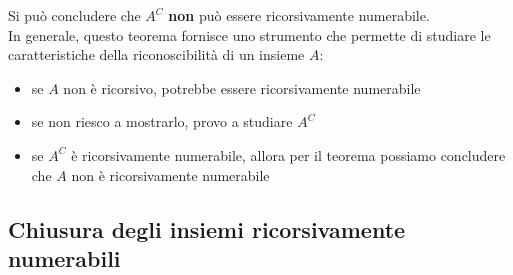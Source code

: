 Si può concludere che $A^C$ \textbf{non} può essere ricorsivamente numerabile.\\

In generale, questo teorema fornisce uno strumento che permette di studiare le caratteristiche della riconoscibilità di un insieme $A$: 
\begin{itemize}
	\item se $A$ non è ricorsivo, potrebbe essere ricorsivamente numerabile
	\item se non riesco a mostrarlo, provo a studiare $A^C$
	\item se $A^C$ è ricorsivamente numerabile, allora per il teorema possiamo concludere che $A$ non è ricorsivamente numerabile
\end{itemize}

\subsection{Chiusura degli insiemi ricorsivamente numerabili}

